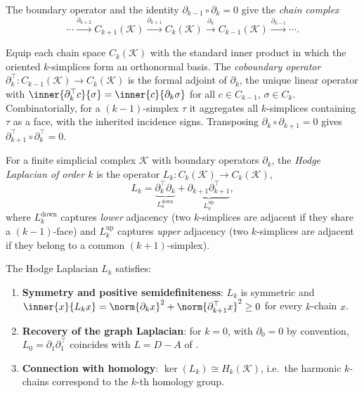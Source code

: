 The boundary operator and the identity $\partial_{k-1} \circ \partial_k = 0$ give
the \emph{chain complex}
\[
  \cdots \xrightarrow{\partial_{k+2}} C_{k+1}(\mathcal{K})
    \xrightarrow{\partial_{k+1}} C_k(\mathcal{K})
    \xrightarrow{\partial_k} C_{k-1}(\mathcal{K})
    \xrightarrow{\partial_{k-1}} \cdots .
\]

\begin{definition}
\label{def:graphs:coboundary}
Equip each chain space $C_k(\mathcal{K})$ with the standard inner product in
which the oriented $k$-simplices form an orthonormal basis. The
\emph{coboundary operator}
$\partial_k^\top \colon C_{k-1}(\mathcal{K}) \to C_k(\mathcal{K})$ is the formal
adjoint of $\partial_k$, the unique linear operator with
$\inner{\partial_k^\top c}{\sigma} = \inner{c}{\partial_k \sigma}$ for all
$c \in C_{k-1}$, $\sigma \in C_k$. Combinatorially, for a $(k{-}1)$-simplex
$\tau$ it aggregates all $k$-simplices containing $\tau$ as a face, with the
inherited incidence signs. Transposing
$\partial_k \circ \partial_{k+1} = 0$ gives
$\partial_{k+1}^\top \circ \partial_k^\top = 0$.
\end{definition}

\begin{definition}
\label{def:graphs:hodge}
For a finite simplicial complex $\mathcal{K}$ with boundary operators
$\partial_k$, the \emph{Hodge Laplacian of order $k$} is the operator
$L_k \colon C_k(\mathcal{K}) \to C_k(\mathcal{K})$,
\[
  L_k = \underbrace{\partial_k^\top \partial_k}_{L_k^{\mathrm{down}}}
      + \underbrace{\partial_{k+1} \partial_{k+1}^\top}_{L_k^{\mathrm{up}}},
\]
where $L_k^{\mathrm{down}}$ captures \emph{lower} adjacency (two $k$-simplices are
adjacent if they share a $(k{-}1)$-face) and $L_k^{\mathrm{up}}$ captures
\emph{upper} adjacency (two $k$-simplices are adjacent if they belong to a common
$(k{+}1)$-simplex).
\end{definition}

\begin{proposition}
\label{prop:graphs:hodge-props}
The Hodge Laplacian $L_k$ satisfies:
\begin{enumerate}
  \item \textbf{Symmetry and positive semidefiniteness}: $L_k$ is symmetric and
        $\inner{x}{L_k x} = \norm{\partial_k x}^2 + \norm{\partial_{k+1}^\top x}^2
        \ge 0$ for every $k$-chain $x$.
  \item \textbf{Recovery of the graph Laplacian}: for $k = 0$, with
        $\partial_0 = 0$ by convention, $L_0 = \partial_1 \partial_1^\top$
        coincides with $L = D - A$ of .
  \item \textbf{Connection with homology}: $\ker(L_k) \cong H_k(\mathcal{K})$,
        i.e.\ the harmonic $k$-chains correspond to the $k$-th homology group.
\end{enumerate}
\end{proposition}

